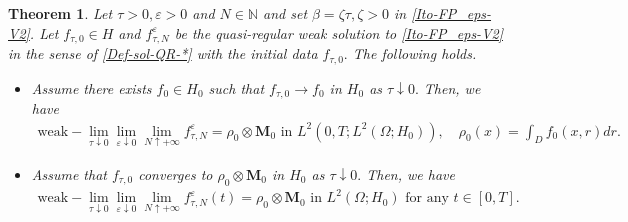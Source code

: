\documentclass[a4paper,12pt, reqno]{amsart}
\newtheorem{theorem}{Theorem}
\begin{document}
 \begin{theorem} 
Let $\tau>0, \varepsilon>0$ and	 $N\in   \mathbb{N}$ and  set  $\beta=\zeta \tau, \zeta>0$	   in  \eqref{Ito-FP_eps-V2}.  Let $f_{\tau,0}\in H$ and  $f^\varepsilon_{\tau,N}$  be the   quasi-regular weak solution   to  \eqref{Ito-FP_eps-V2}  in the sense of \autoref{Def-sol-QR-*} with the initial data $f_{\tau,0}.$
The following holds.
\begin{itemize}
    \item   Assume there exists $f_0\in H_0$ such that   $f_{\tau, 0} \to f_0$ in $H_0$ as $\tau \downarrow 0.$ Then, we have
    \begin{align*}
    \displaystyle \text{weak}-\lim_{\tau\downarrow 0}\lim_{\varepsilon\downarrow 0}\lim_{N\uparrow +\infty}   f^\varepsilon_{\tau,N}= \rho_{0}\otimes\mathbf{M}_0 \text{ in } L^2(0,T;L^2(\Omega;H_0)), \quad \rho_0(x)=\int_D f_0(x,r) dr.
    \end{align*}
 \item     Assume that $f_{\tau,0}$ converges to $ \rho_{0}\otimes\mathbf{M}_0$ in $H_0$ as $\tau \downarrow 0.$ Then,  we have
      \begin{align*}
    \displaystyle \text{weak}-\lim_{\tau\downarrow 0}\lim_{\varepsilon\downarrow 0}\lim_{N\uparrow +\infty}   f^\varepsilon_{\tau,N}(t)= \rho_{0}\otimes\mathbf{M}_0 \text{ in } L^2(\Omega;H_0) \text{ for any } t\in [0,T].
    \end{align*}
\end{itemize} 
    \end{theorem}
\end{document}
